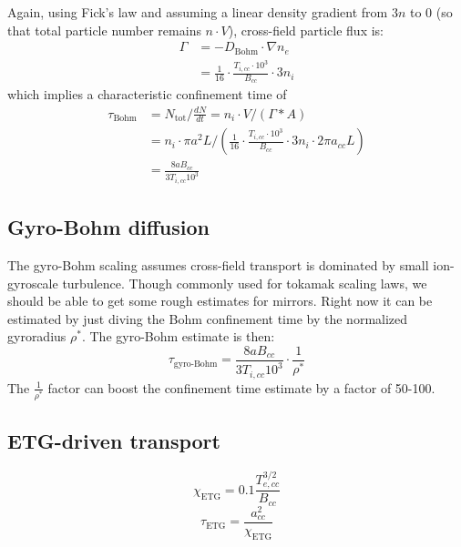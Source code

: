 Again, using Fick's law and assuming a linear density gradient from $3 n$ to 0 (so that total particle number remains $n \cdot V$), cross-field particle flux is:
\begin{align}
    \Gamma &= - D_\text{Bohm} \cdot \nabla n_e \\
    & = \frac{1}{16} \cdot \frac{T_{i,cc} \cdot 10^3}{B_{cc}} \cdot 3 n_i
\end{align}
which implies a characteristic confinement time of
\begin{align}
    \tau_\text{Bohm} &= N_\text{tot} \bigg/ \frac{dN}{dt} = n_i \cdot V / \left(\Gamma * A\right) \\
    &= n_i \cdot \pi a^2 L \bigg/ \left(\frac{1}{16} \cdot \frac{T_{i,cc} \cdot 10^3}{B_{cc}} \cdot 3 n_i \cdot 2 \pi a_{cc} L\right) \\
    &= \frac{8 a B_{cc}}{3 T_{i,cc} 10^3}
\end{align}

\subsection{Gyro-Bohm diffusion}

The gyro-Bohm scaling assumes cross-field transport is dominated by small ion-gyroscale turbulence. Though commonly used for tokamak scaling laws, we should be able to get some rough estimates for mirrors. Right now it can be estimated by just diving the Bohm confinement time by the normalized gyroradius $\rho^*$.
The gyro-Bohm estimate is then:
\begin{equation}
    \tau_\text{gyro-Bohm} = \frac{8 a B_{cc}}{3 T_{i,cc} 10^3} \cdot \frac{1}{\rho^*}
\end{equation}
The $\frac{1}{\rho^*}$ factor can boost the confinement time estimate by a factor of 50-100. 

\subsection{ETG-driven transport}

\begin{equation}
    \chi_\text{ETG} = 0.1 \frac{T_{e,cc}^{3/2}}{B_{cc}}
\end{equation}
\begin{equation}
    \tau_\text{ETG} = \frac{a_{cc}^2}{\chi_\text{ETG}}
\end{equation}

